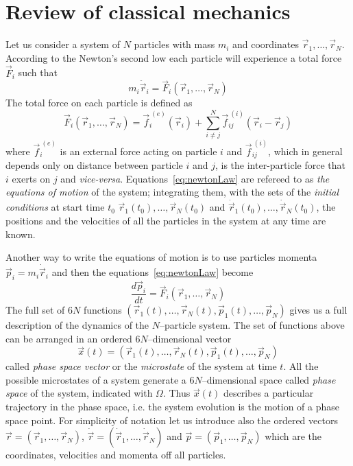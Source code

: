 \section{Review of classical mechanics}
Let us consider a system of $N$ particles with mass $m_i$ and coordinates $\vec r_1,\dots,\vec r_N$. According 
to the Newton's second low each particle will experience a total force $\vec F_i$ such that
\begin{equation}
	m_i \ddot{\vec{r}}_i = \vec F_i(\vec r_1,\dots,\vec r_N)
	\label{eq:newtonLaw}
\end{equation}
The total force on each particle is defined as
\begin{equation*}
	\vec F_i(\vec r_1,\dots,\vec r_N) = \vec{f}_i^{\ (e)}(\vec r_i) + \sum_{i\ne j}^N \vec{f}_{ij}^{\ (i)}(\vec r_i - \vec r_j )
\end{equation*}
where $\vec{f}_i^{\ (e)}$ is an external force acting on particle $i$ and $\vec{f}_{ij}^{\ (i)}$, which in general
depends only on distance between particle $i$ and $j$, is the inter-particle force that $i$ exerts on $j$ and
\textit{vice-versa}. Equations~\eqref{eq:newtonLaw} are refereed to as \textit{the equations of motion} of the
system; integrating them, with the sets of the \textit{initial conditions} at start time 
$t_0$ $\vec r_1(t_0),\dots,\vec r_N(t_0)$ and $\dot{\vec{r}}_1(t_0),\dots,\dot{\vec{r}}_N(t_0)$, the positions 
and the velocities of all the particles in the system at any time are known.

Another way to write the equations of motion is to use particles momenta $\vec p_i = m_i \dot{\vec{r}}_i$ and then
the equations~\eqref{eq:newtonLaw} become
\begin{equation}
	\frac{d\vec p_i}{dt} = \vec F_i(\vec r_1,\dots,\vec r_N)
	\label{eq:newtonLawMom}
\end{equation}
The full set of $6N$ functions $(\vec r_1(t),\dots,\vec r_N(t),\vec p_1(t),\dots,\vec p_N)$ gives us a full
description of the dynamics of the $N$--particle system. The set of functions above can be arranged in an ordered 
$6N$--dimensional vector
\begin{equation}
	\vec x(t) = (\vec r_1(t),\dots,\vec r_N(t),\vec p_1(t),\dots,\vec p_N)
	\label{eq:phSpaceVector}
\end{equation}
called \textit{phase space vector} or the \textit{microstate} of the system at time $t$. All the possible
microstates of a system generate a $6N$--dimensional space called \textit{phase space} of the system, indicated 
with $\Omega$. Thus $\vec x(t)$ describes a particular trajectory in the phase space, i.e. the system evolution 
is the motion of a phase space point. For simplicity of notation let us introduce also the ordered vectors $\vec r = (\vec r_1, \dots, \vec r_N)$, $\dot{\vec r} = (\dot{\vec{r}}_1,\dots,\dot{\vec{r}}_N)$ and $\vec p = (\vec p_1, \dots, \vec p_N)$ which are the coordinates, velocities and momenta off all particles.

